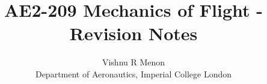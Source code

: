 \documentclass{summary_notes}
\begin{document}
\title{\textbf{AE2-209 Mechanics of Flight - Revision Notes}}
\author{Vishnu R Menon\\ 
\small{Department of Aeronautics, Imperial College London}}

\maketitle
\tableofcontents

\newpage
\end{document}

